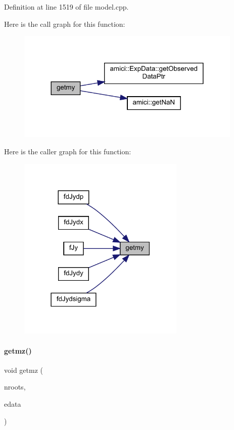 Definition at line 1519 of file model.\+cpp.

Here is the call graph for this function\+:
\nopagebreak
\begin{figure}[H]
\begin{center}
\leavevmode
\includegraphics[width=305pt]{classamici_1_1_model_aa01d5361cf972cce5eaddca05985f745_cgraph}
\end{center}
\end{figure}
Here is the caller graph for this function\+:
\nopagebreak
\begin{figure}[H]
\begin{center}
\leavevmode
\includegraphics[width=226pt]{classamici_1_1_model_aa01d5361cf972cce5eaddca05985f745_icgraph}
\end{center}
\end{figure}
\mbox{\label{classamici_1_1_model_a523a7d80e06bfab324d566dd6032abcf}} 
\paragraph{\texorpdfstring{getmz()}{getmz()}}
{\footnotesize\ttfamily void getmz (\begin{DoxyParamCaption}\item[{const int}]{nroots,  }\item[{const \mbox{\hyperlink{classamici_1_1_exp_data}{Exp\+Data}} $\ast$}]{edata }\end{DoxyParamCaption})\hspace{0.3cm}{\ttfamily [protected]}}

